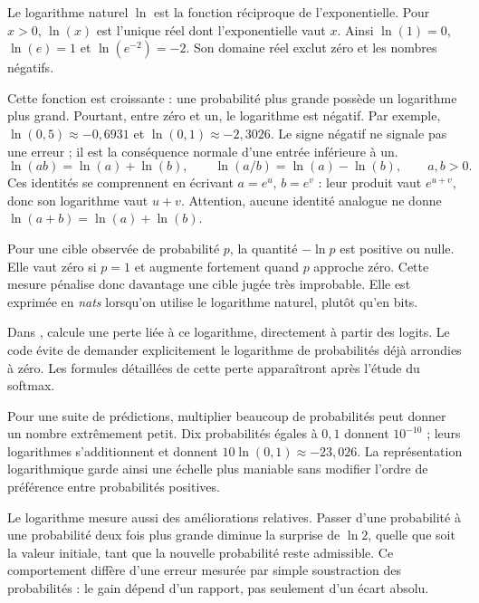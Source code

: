 
Le logarithme naturel \(\ln\) est la fonction réciproque de
l'exponentielle. Pour \(x>0\), \(\ln(x)\) est l'unique réel
dont l'exponentielle vaut \(x\). Ainsi \(\ln(1)=0\),
\(\ln(e)=1\) et \(\ln(e^{-2})=-2\).
Son domaine réel exclut zéro et les nombres négatifs.

Cette fonction est croissante : une probabilité plus grande possède
un logarithme plus grand. Pourtant, entre zéro et un, le logarithme
est négatif. Par exemple, \(\ln(0{,}5)\approx-0{,}6931\)
et \(\ln(0{,}1)\approx-2{,}3026\).
Le signe négatif ne signale pas une erreur ; il est la conséquence
normale d'une entrée inférieure à un.
\[
 \ln(ab)=\ln(a)+\ln(b),\qquad
 \ln(a/b)=\ln(a)-\ln(b),\qquad a,b>0.
\]
Ces identités se comprennent en écrivant \(a=e^u\), \(b=e^v\) :
leur produit vaut \(e^{u+v}\), donc son logarithme vaut \(u+v\).
Attention, aucune identité analogue ne donne
\(\ln(a+b)=\ln(a)+\ln(b)\).

Pour une cible observée de probabilité \(p\), la quantité
\(-\ln p\) est positive ou nulle. Elle vaut zéro si \(p=1\)
et augmente fortement quand \(p\) approche zéro.
Cette mesure pénalise donc davantage une cible jugée très improbable.
Elle est exprimée en \emph{nats} lorsqu'on utilise le logarithme
naturel, plutôt qu'en bits.

Dans ,  calcule
une perte liée à ce logarithme, directement à partir des logits.
Le code évite de demander explicitement le logarithme de
probabilités déjà arrondies à zéro. Les formules détaillées de
cette perte apparaîtront après l'étude du softmax.

Pour une suite de prédictions, multiplier beaucoup de probabilités
peut donner un nombre extrêmement petit. Dix probabilités égales
à \(0{,}1\) donnent \(10^{-10}\) ; leurs logarithmes s'additionnent
et donnent \(10\ln(0{,}1)\approx-23{,}026\).
La représentation logarithmique garde ainsi une échelle plus maniable
sans modifier l'ordre de préférence entre probabilités positives.

Le logarithme mesure aussi des améliorations relatives.
Passer d'une probabilité à une probabilité deux fois plus grande
diminue la surprise de \(\ln2\), quelle que soit la valeur
initiale, tant que la nouvelle probabilité reste admissible.
Ce comportement diffère d'une erreur mesurée par simple
soustraction des probabilités : le gain dépend d'un rapport,
pas seulement d'un écart absolu.

